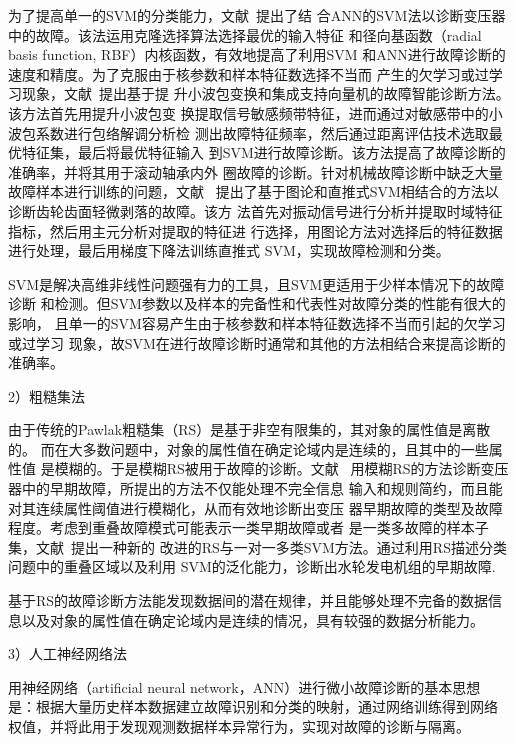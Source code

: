 为了提高单一的SVM的分类能力，文献~提出了结
合ANN的SVM法以诊断变压器中的故障。该法运用克隆选择算法选择最优的输入特征
和径向基函数（radial basis function, RBF）内核函数，有效地提高了利用SVM
和ANN进行故障诊断的速度和精度。为了克服由于核参数和样本特征数选择不当而
产生的欠学习或过学习现象，文献~提出基于提
升小波包变换和集成支持向量机的故障智能诊断方法。该方法首先用提升小波包变
换提取信号敏感频带特征，进而通过对敏感带中的小波包系数进行包络解调分析检
测出故障特征频率，然后通过距离评估技术选取最优特征集，最后将最优特征输入
到SVM进行故障诊断。该方法提高了故障诊断的准确率，并将其用于滚动轴承内外
圈故障的诊断。针对机械故障诊断中缺乏大量故障样本进行训练的问题，文献~
提出了基于图论和直推式SVM相结合的方法以诊断齿轮齿面轻微剥落的故障。该方
法首先对振动信号进行分析并提取时域特征指标，然后用主元分析对提取的特征进
行选择，用图论方法对选择后的特征数据进行处理，最后用梯度下降法训练直推式
SVM，实现故障检测和分类。

SVM是解决高维非线性问题强有力的工具，且SVM更适用于少样本情况下的故障诊断
和检测。但SVM参数以及样本的完备性和代表性对故障分类的性能有很大的影响，
且单一的SVM容易产生由于核参数和样本特征数选择不当而引起的欠学习或过学习
现象，故SVM在进行故障诊断时通常和其他的方法相结合来提高诊断的准确率。

2）粗糙集法

由于传统的Pawlak粗糙集（RS）是基于非空有限集的，其对象的属性值是离散的。
而在大多数问题中，对象的属性值在确定论域内是连续的，且其中的一些属性值
是模糊的。于是模糊RS被用于故障的诊断。文献~
用模糊RS的方法诊断变压器中的早期故障，所提出的方法不仅能处理不完全信息
输入和规则简约，而且能对其连续属性阈值进行模糊化，从而有效地诊断出变压
器早期故障的类型及故障程度。考虑到重叠故障模式可能表示一类早期故障或者
是一类多故障的样本子集，文献~提出一种新的
改进的RS与一对一多类SVM方法。通过利用RS描述分类问题中的重叠区域以及利用
SVM的泛化能力，诊断出水轮发电机组的早期故障.

基于RS的故障诊断方法能发现数据间的潜在规律，并且能够处理不完备的数据信
息以及对象的属性值在确定论域内是连续的情况，具有较强的数据分析能力。

3）人工神经网络法

用神经网络（artificial neural network，ANN）进行微小故障诊断的基本思想
是：根据大量历史样本数据建立故障识别和分类的映射，通过网络训练得到网络
权值，并将此用于发现观测数据样本异常行为，实现对故障的诊断与隔离。

